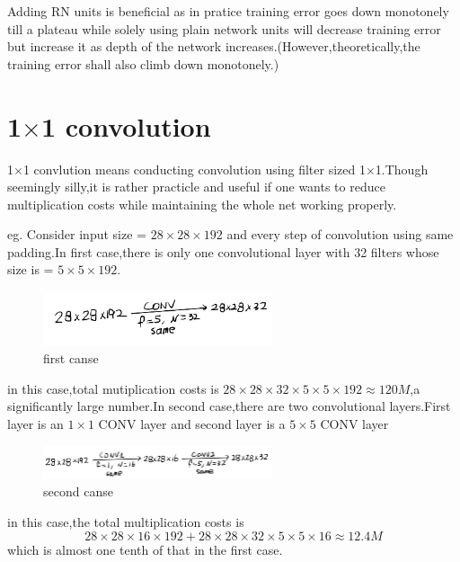 \documentclass{article}
\begin{document}
\par Adding RN units is beneficial as in pratice training error goes down monotonely till a plateau while solely using plain network units will decrease training error but increase it as depth of the network increases.(However,theoretically,the training error shall also climb down monotonely.)
\section{1$\times$1 convolution}
1$\times$1 convlution means conducting convolution using filter sized 1$\times$1.Though seemingly silly,it is rather practicle and useful if one wants to reduce multiplication costs while maintaining the whole net working properly.
\par eg. Consider input size = $28\times28\times192$ and every step of convolution using same padding.In first case,there is only one convolutional layer with 32 filters whose size is = $5\times5\times192$.
\begin{figure}[htbp]
	\centering
	\includegraphics[width=0.6\textwidth]{11.jpg}
	\caption{first canse}
\end{figure}
in this case,total mutiplication costs is $28\times28\times32\times5\times5\times192\approx120M$,a significantly large number.In second case,there are two convolutional layers.First layer is an $1\times1$ CONV layer and second layer is a $5\times5$ CONV layer
\begin{figure}[htbp]
	\centering
	\includegraphics[width=0.6\textwidth]{12.jpg}
	\caption{second canse}
\end{figure}
in this case,the total multiplication costs is $$28\times28\times16\times192+28\times28\times32\times5\times5\times16\approx12.4M$$
which is almost one tenth of that in the first case.
\end{document}
